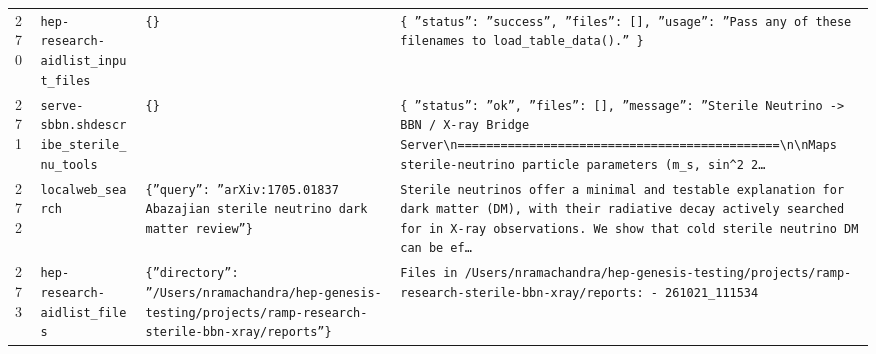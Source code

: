\documentclass[11pt,a4paper]{article}
\begin{document}
\begin{longtable}{@{}p{}p{}p{}p{}@{}}
270 & \texttt{hep-research-aid}\newline\texttt{list\_\allowbreak{}input\_\allowbreak{}files} & \texttt{\{\}\allowbreak{}} & \texttt{\{   ''status'':\allowbreak{} ''success'',\allowbreak{}   ''files'':\allowbreak{} []\allowbreak{},\allowbreak{}   ''usage'':\allowbreak{} ''Pass any of these filenames to load\_\allowbreak{}table\_\allowbreak{}data()\allowbreak{}.'' \}\allowbreak{}} \\
271 & \texttt{serve-sbbn.sh}\newline\texttt{describe\_\allowbreak{}sterile\_\allowbreak{}nu\_\allowbreak{}tools} & \texttt{\{\}\allowbreak{}} & \texttt{\{   ''status'':\allowbreak{} ''ok'',\allowbreak{}   ''files'':\allowbreak{} []\allowbreak{},\allowbreak{}   ''message'':\allowbreak{} ''Sterile Neutrino -\textgreater{}\allowbreak{} BBN /\allowbreak{} X-ray Bridge Server\textbackslash{}\allowbreak{}n=\allowbreak{}=\allowbreak{}=\allowbreak{}=\allowbreak{}=\allowbreak{}=\allowbreak{}=\allowbreak{}=\allowbreak{}=\allowbreak{}=\allowbreak{}=\allowbreak{}=\allowbreak{}=\allowbreak{}=\allowbreak{}=\allowbreak{}=\allowbreak{}=\allowbreak{}=\allowbreak{}=\allowbreak{}=\allowbreak{}=\allowbreak{}=\allowbreak{}=\allowbreak{}=\allowbreak{}=\allowbreak{}=\allowbreak{}=\allowbreak{}=\allowbreak{}=\allowbreak{}=\allowbreak{}=\allowbreak{}=\allowbreak{}=\allowbreak{}=\allowbreak{}=\allowbreak{}=\allowbreak{}=\allowbreak{}=\allowbreak{}=\allowbreak{}=\allowbreak{}=\allowbreak{}=\allowbreak{}=\allowbreak{}=\allowbreak{}=\allowbreak{}\textbackslash{}\allowbreak{}n\textbackslash{}\allowbreak{}nMaps sterile-neutrino particle parameters (m\_\allowbreak{}s,\allowbreak{} sin\textasciicircum{}\allowbreak{}2 2\ldots{}\allowbreak{}} \\
272 & \texttt{local}\newline\texttt{web\_\allowbreak{}search} & \texttt{\{''query'':\allowbreak{} ''arXiv:\allowbreak{}1705.01837 Abazajian sterile neutrino dark matter review''\}\allowbreak{}} & \texttt{Sterile neutrinos offer a minimal and testable explanation for dark matter (DM)\allowbreak{},\allowbreak{} with their radiative decay actively searched for in X-ray observations. We show that cold sterile neutrino DM can be ef\ldots{}\allowbreak{}} \\
273 & \texttt{hep-research-aid}\newline\texttt{list\_\allowbreak{}files} & \texttt{\{''directory'':\allowbreak{} ''/\allowbreak{}Users/\allowbreak{}nramachandra/\allowbreak{}hep-genesis-testing/\allowbreak{}projects/\allowbreak{}ramp-research-sterile-bbn-xray/\allowbreak{}reports''\}\allowbreak{}} & \texttt{Files in /\allowbreak{}Users/\allowbreak{}nramachandra/\allowbreak{}hep-genesis-testing/\allowbreak{}projects/\allowbreak{}ramp-research-sterile-bbn-xray/\allowbreak{}reports:\allowbreak{}   - 261021\_\allowbreak{}111534} \\

\end{longtable}
\end{document}
